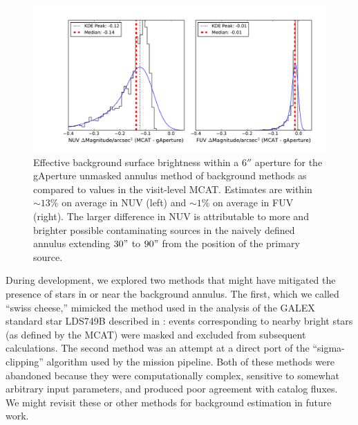 \documentclass[preprint]{aastex}
\begin{document}
\begin{figure}[h]
\includegraphics[scale=0.65]{Fig03.pdf}
\caption{Effective background surface brightness within a $6''$ aperture for the gAperture unmasked annulus method of background methods as compared to values in the visit-level MCAT. Estimates are within $\sim 13\%$ on average in NUV (left) and $\sim 1\%$ on average in FUV (right). The larger difference in NUV is attributable to more and brighter possible contaminating sources in the naively defined annulus extending $30"$ to $90"$ from the position of the primary source.
\label{bgrelphot}}
\end{figure}

During development, we explored two methods that might have mitigated the presence of stars in or near the background annulus. The first, which we called ``swiss cheese,'' mimicked the method used in the analysis of the GALEX standard star LDS749B described in \citep{mor2007}: events corresponding to nearby bright stars (as defined by the MCAT) were masked and excluded from subsequent calculations. The second method was an attempt at a direct port of the ``sigma-clipping'' algorithm used by the mission pipeline. Both of these methods were abandoned because they were computationally complex, sensitive to somewhat arbitrary input parameters, and produced poor agreement with catalog fluxes. We might revisit these or other methods for background estimation in future work.
\end{document}
